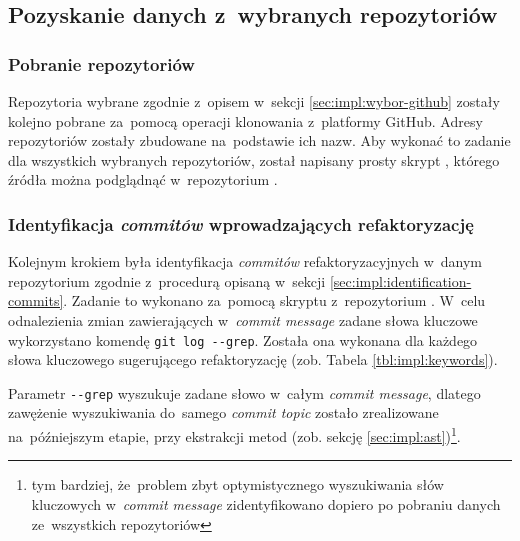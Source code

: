 \documentclass[twoside]{praca}
\begin{document}
\subsection{Pozyskanie danych z~wybranych repozytoriów}
\subsubsection{Pobranie repozytoriów}
Repozytoria wybrane zgodnie z~opisem w~sekcji \ref{sec:impl:wybor-github} zostały kolejno pobrane za~pomocą operacji klonowania z~platformy GitHub. Adresy repozytoriów zostały zbudowane na~podstawie ich nazw. 
Aby wykonać to zadanie dla wszystkich wybranych repozytoriów, został napisany prosty skrypt , którego źródła można podglądnąć w~repozytorium \cite{fracz:refactor-extractor}.


\subsubsection{Identyfikacja \textit{commitów} wprowadzających refaktoryzację}
Kolejnym krokiem była identyfikacja \textit{commitów} refaktoryzacyjnych w~danym repozytorium zgodnie z~procedurą opisaną w~sekcji \ref{sec:impl:identification-commits}. Zadanie to wykonano za~pomocą skryptu  z~repozytorium \cite{fracz:refactor-extractor}. W~celu odnalezienia zmian zawierających w~\textit{commit message} zadane słowa kluczowe wykorzystano komendę \texttt{git log -{}-grep}. Została ona wykonana dla każdego słowa kluczowego sugerującego refaktoryzację (zob. Tabela \ref{tbl:impl:keywords}).


Parametr \texttt{-{}-grep} wyszukuje zadane słowo w~całym \textit{commit message}, dlatego zawężenie wyszukiwania do~samego \textit{commit topic} zostało zrealizowane na~późniejszym etapie, przy ekstrakcji metod (zob. sekcję \ref{sec:impl:ast})\footnote{tym bardziej, że~problem zbyt optymistycznego wyszukiwania słów kluczowych w~\textit{commit message} zidentyfikowano dopiero po pobraniu danych ze~wszystkich repozytoriów}. 
\end{document}
